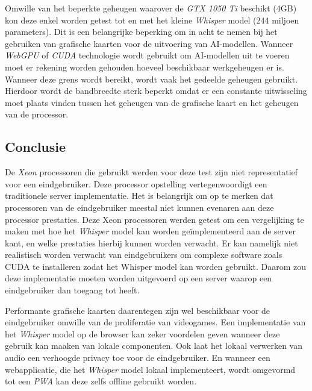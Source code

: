 \bigbreak{}

Omwille van het beperkte geheugen waarover de \textit{GTX 1050 Ti} beschikt (4GB) kon deze enkel worden getest tot en met het kleine \textit{Whisper} model (244 miljoen parameters). Dit is een belangrijke beperking om in acht te nemen bij het gebruiken van grafische kaarten voor de uitvoering van AI-modellen. Wanneer \textit{WebGPU} of \textit{CUDA} technologie wordt gebruikt om AI-modellen uit te voeren moet er rekening worden gehouden hoeveel beschikbaar werkgeheugen er is. Wanneer deze grens wordt bereikt, wordt vaak het gedeelde geheugen gebruikt. Hierdoor wordt de bandbreedte sterk beperkt omdat er een constante uitwisseling moet plaats vinden tussen het geheugen van de grafische kaart en het geheugen van de processor.

\subsection{Conclusie}

De \textit{Xeon} processoren die gebruikt werden voor deze test zijn niet representatief voor een eindgebruiker. Deze processor opstelling vertegenwoordigt een traditionele server implementatie. Het is belangrijk om op te merken dat processoren van de eindgebruiker meestal niet kunnen evenaren aan deze processor prestaties. Deze Xeon processoren werden getest om een vergelijking te maken met hoe het \textit{Whisper} model kan worden geïmplementeerd aan de server kant, en welke prestaties hierbij kunnen worden verwacht. Er kan namelijk niet realistisch worden verwacht van eindgebruikers om complexe software zoals CUDA te installeren zodat het Whisper model kan worden gebruikt. Daarom zou deze implementatie moeten worden uitgevoerd op een server waarop een eindgebruiker dan toegang tot heeft.

\bigbreak{}

Performante grafische kaarten daarentegen zijn wel beschikbaar voor de eindgebruiker omwille van de proliferatie van videogames. Een implementatie van het \textit{Whisper} model op de browser kan zeker voordelen geven wanneer deze gebruik kan maaken van lokale componenten. Ook laat het lokaal verwerken van audio een verhoogde privacy toe voor de eindgebruiker. En wanneer een webapplicatie, die het \textit{Whisper} model lokaal implementeert, wordt omgevormd tot een \textit{PWA} kan deze zelfs offline gebruikt worden.


